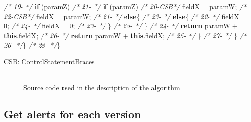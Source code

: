 \documentclass[
]{article}
\newenvironment{Shaded}{\begin{snugshade}}{\end{snugshade}}
\newcommand{\CommentTok}[1]{\textcolor[rgb]{0.56,0.35,0.01}{\textit{#1}}}
\newcommand{\DecValTok}[1]{\textcolor[rgb]{0.00,0.00,0.81}{#1}}
\newcommand{\FunctionTok}[1]{\textcolor[rgb]{0.00,0.00,0.00}{#1}}
\newcommand{\KeywordTok}[1]{\textcolor[rgb]{0.13,0.29,0.53}{\textbf{#1}}}
\newcommand{\NormalTok}[1]{#1}
\begin{document}
\begin{Shaded}
\begin{Highlighting}[]
\CommentTok{/* 19-   */}        \KeywordTok{if}\NormalTok{ (paramZ)                                      }\CommentTok{/* 21-   */}        \KeywordTok{if}\NormalTok{ (paramZ)                                      }
\CommentTok{/* 20-CSB*/}\NormalTok{            fieldX = paramW;                             }\CommentTok{/* 22-CSB*/}\NormalTok{            fieldX = paramW;                             }
\CommentTok{/* 21-   */}        \KeywordTok{else}\NormalTok{\{                                            }\CommentTok{/* 23-   */}        \KeywordTok{else}\NormalTok{\{                                            }
\CommentTok{/* 22-   */}\NormalTok{            fieldX = }\DecValTok{0}\NormalTok{;                                  }\CommentTok{/* 24-   */}\NormalTok{            fieldX = }\DecValTok{0}\NormalTok{;                                  }
\CommentTok{/* 23-   */}\NormalTok{     \}                                                        }\CommentTok{/* 25-   */}\NormalTok{        \}                                                        }
\CommentTok{/* 24-   */}        \KeywordTok{return}\NormalTok{ paramW + }\KeywordTok{this}\NormalTok{.}\FunctionTok{fieldX}\NormalTok{;                     }\CommentTok{/* 26-   */}        \KeywordTok{return}\NormalTok{ paramW + }\KeywordTok{this}\NormalTok{.}\FunctionTok{fieldX}\NormalTok{;                     }
\CommentTok{/* 25-   */}\NormalTok{     \}                                                   }\CommentTok{/* 27-   */}\NormalTok{     \}                                                   }
\CommentTok{/* 26-   */}\NormalTok{\}                                                        }\CommentTok{/* 28-   */}\NormalTok{\}                                                        }


\NormalTok{CSB: ControlStatementBraces}
\end{Highlighting}
\end{Shaded}

\normalsize

\begin{figure}
\centering
\includegraphics{figures/fake.png}
\caption{Source code used in the description of the algorithm}
\end{figure}

\subsection{Get alerts for each version}
\end{document}
